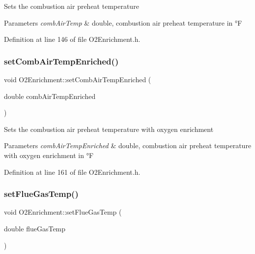 Sets the combustion air preheat temperature 
\begin{DoxyParams}{Parameters}
{\em comb\+Air\+Temp} & double, combustion air preheat temperature in °F \\
\hline
\end{DoxyParams}


Definition at line 146 of file O2\+Enrichment.\+h.

\mbox{\label{class_o2_enrichment_af245c75ea525a0f5955686b360b54dbb}} 
\subsubsection{\texorpdfstring{set\+Comb\+Air\+Temp\+Enriched()}{setCombAirTempEnriched()}}
{\footnotesize\ttfamily void O2\+Enrichment\+::set\+Comb\+Air\+Temp\+Enriched (\begin{DoxyParamCaption}\item[{double}]{comb\+Air\+Temp\+Enriched }\end{DoxyParamCaption})\hspace{0.3cm}{\ttfamily [inline]}}

Sets the combustion air preheat temperature with oxygen enrichment 
\begin{DoxyParams}{Parameters}
{\em comb\+Air\+Temp\+Enriched} & double, combustion air preheat temperature with oxygen enrichment in °F \\
\hline
\end{DoxyParams}


Definition at line 161 of file O2\+Enrichment.\+h.

\mbox{\label{class_o2_enrichment_a37e625de13b171a6db256a108455aab9}} 
\subsubsection{\texorpdfstring{set\+Flue\+Gas\+Temp()}{setFlueGasTemp()}}
{\footnotesize\ttfamily void O2\+Enrichment\+::set\+Flue\+Gas\+Temp (\begin{DoxyParamCaption}\item[{double}]{flue\+Gas\+Temp }\end{DoxyParamCaption})\hspace{0.3cm}{\ttfamily [inline]}}

